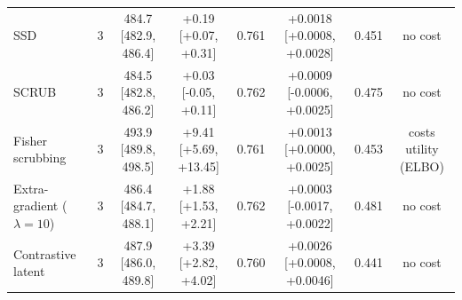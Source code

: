 \begin{tabular}{lccccccc}
SSD & 3 & 484.7 [482.9, 486.4] & +0.19 [+0.07, +0.31] & 0.761 & +0.0018 [+0.0008, +0.0028] & 0.451 & no cost \\
SCRUB & 3 & 484.5 [482.8, 486.2] & +0.03 [-0.05, +0.11] & 0.762 & +0.0009 [-0.0006, +0.0025] & 0.475 & no cost \\
Fisher scrubbing & 3 & 493.9 [489.8, 498.5] & +9.41 [+5.69, +13.45] & 0.761 & +0.0013 [+0.0000, +0.0025] & 0.453 & costs utility (ELBO) \\
Extra-gradient ($\lambda=10$) & 3 & 486.4 [484.7, 488.1] & +1.88 [+1.53, +2.21] & 0.762 & +0.0003 [-0.0017, +0.0022] & 0.481 & no cost \\
Contrastive latent & 3 & 487.9 [486.0, 489.8] & +3.39 [+2.82, +4.02] & 0.760 & +0.0026 [+0.0008, +0.0046] & 0.441 & no cost \\
\bottomrule
\end{tabular}

